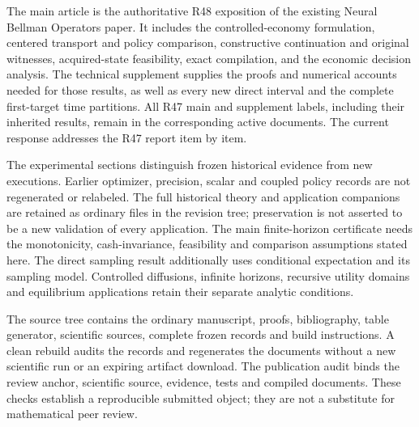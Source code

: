 The main article is the authoritative R48 exposition of the existing Neural Bellman Operators paper. It includes the controlled-economy formulation, centered transport and policy comparison, constructive continuation and original witnesses, acquired-state feasibility, exact compilation, and the economic decision analysis. The technical supplement supplies the proofs and numerical accounts needed for those results, as well as every new direct interval and the complete first-target time partitions. All R47 main and supplement labels, including their inherited results, remain in the corresponding active documents. The current response addresses the R47 report item by item.

The experimental sections distinguish frozen historical evidence from new executions. Earlier optimizer, precision, scalar and coupled policy records are not regenerated or relabeled. The full historical theory and application companions are retained as ordinary files in the revision tree; preservation is not asserted to be a new validation of every application. The main finite-horizon certificate needs the monotonicity, cash-invariance, feasibility and comparison assumptions stated here. The direct sampling result additionally uses conditional expectation and its sampling model. Controlled diffusions, infinite horizons, recursive utility domains and equilibrium applications retain their separate analytic conditions.

The source tree contains the ordinary manuscript, proofs, bibliography, table generator, scientific sources, complete frozen records and build instructions. A clean rebuild audits the records and regenerates the documents without a new scientific run or an expiring artifact download. The publication audit binds the review anchor, scientific source, evidence, tests and compiled documents. These checks establish a reproducible submitted object; they are not a substitute for mathematical peer review.
